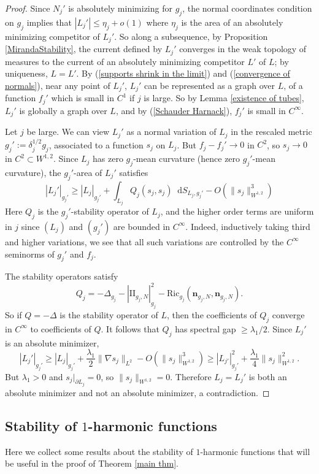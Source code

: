 \documentclass[reqno,11pt]{amsart}
\newcommand*\dif{\mathop{}\!\mathrm{d}}
\newcommand{\Two}{\mathrm{I\!I}}
\newcommand{\normal}{\mathbf n}
\newcommand{\Ric}{\mathrm{Ric}}
\theoremstyle{definition}
\numberwithin{equation}{section}
\begin{document}
\begin{proof}
Since $N_j'$ is absolutely minimizing for $g_j$, the normal coordinates condition on $g_j$ implies that $|L_j'| \leq \eta_j + o(1)$ where $\eta_j$ is the area of an absolutely minimizing competitor of $L_j'$.
So along a subsequence, by Proposition \ref{MirandaStability}, the current defined by $L_j'$ converges in the weak topology of measures to the current of an absolutely minimizing competitor $L'$ of $L$; by uniqueness, $L = L'$.
By (\ref{supports shrink in the limit}) and (\ref{convergence of normals}), near any point of $L_j'$, $L_j'$ can be represented as a graph over $L$, of a function $f_j'$ which is small in $C^1$ if $j$ is large.
So by Lemma \ref{existence of tubes}, $L_j'$ is globally a graph over $L$, and by (\ref{Schauder Harnack}), $f_j'$ is small in $C^\infty$.

Let $j$ be large.
We can view $L_j'$ as a normal variation of $L_j$ in the rescaled metric $g_j' := \delta_j^{1/2} g_j$, associated to a function $s_j$ on $L_j$.
But $f_j - f_j' \to 0$ in $C^2$, so $s_j \to 0$ in $C^2 \subset W^{1, 2}$.
Since $L_j$ has zero $g_j$-mean curvature (hence zero $g_j'$-mean curvature), the $g_j'$-area of $L_j'$ satisfies
$$|L_j'|_{g_j'} \geq |L_j|_{g_j'} + \int_{L_j} Q_j(s_j, s_j) \dif S_{L_j, g_j'} - O(\|s_j\|_{W^{1, 2}}^3)$$
Here $Q_j$ is the $g_j'$-stability operator of $L_j$, and the higher order terms are uniform in $j$ since $(L_j)$ and $(g_j')$ are bounded in $C^\infty$.
Indeed, inductively taking third and higher variations, we see that all such variations are controlled by the $C^\infty$ seminorms of $g_j'$ and $f_j$.

The stability operators satisfy 
$$Q_j = -\Delta_{g_j} - |\Two_{g_j, N}|_{g_j}^2 - \Ric_{g_j}(\normal_{g_j, N}, \normal_{g_j, N}).$$
So if $Q = -\Delta$ is the stability operator of $L$, then the coefficients of $Q_j$ converge in $C^\infty$ to coefficients of $Q$.
It follows that $Q_j$ has spectral gap $\geq \lambda_1/2$.
Since $L_j'$ is an absolute minimizer,
$$|L_j'|_{g_j'} \geq |L_j|_{g_j'} + \frac{\lambda_1}{2} \|\nabla s_j\|_{L^2} - O(\|s_j\|_{W^{1, 2}}^3) \geq |L_{j'}|_{g_j'}^2 + \frac{\lambda_1}{4} \|s_j\|_{W^{1, 2}}^2.$$
But $\lambda_1 > 0$ and $s_j|_{\partial L_j} = 0$, so $\|s_j\|_{W^{1, 2}} = 0$.
Therefore $L_j = L_j'$ is both an absolute minimizer and not an absolute minimizer, a contradiction.
\end{proof}

\subsection{Stability of \texorpdfstring{$1$-harmonic functions}{one-harmonic functions}}
Here we collect some results about the stability of $1$-harmonic functions that will be useful in the proof of Theorem \ref{main thm}.
\end{document}
